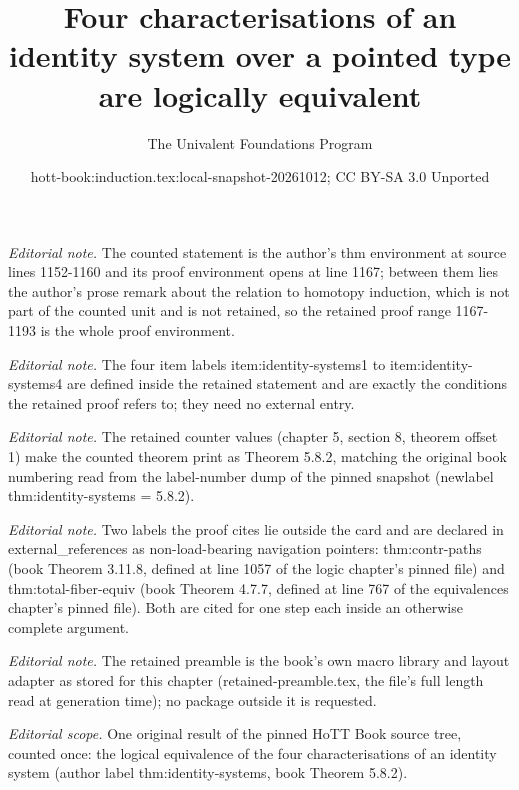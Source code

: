 \documentclass[10pt,a4paper]{article}
\title{Four characterisations of an identity system over a pointed type are logically equivalent}
\author{The Univalent Foundations Program}
\date{hott-book:induction.tex:local-snapshot-20261012; CC BY-SA 3.0 Unported}
\newcounter{chapter}
\theoremstyle{definition}
\theoremstyle{remark}
\numberwithin{equation}{section}
\begin{document}
\maketitle
\setcounter{chapter}{5}
\setcounter{section}{8}
\setcounter{thm}{1}
\noindent\textit{Editorial note.} The counted statement is the author's thm environment at source lines 1152-1160 and its proof environment opens at line 1167; between them lies the author's prose remark about the relation to homotopy induction, which is not part of the counted unit and is not retained, so the retained proof range 1167-1193 is the whole proof environment.\par\medskip
\noindent\textit{Editorial note.} The four item labels item:identity-systems1 to item:identity-systems4 are defined inside the retained statement and are exactly the conditions the retained proof refers to; they need no external entry.\par\medskip
\noindent\textit{Editorial note.} The retained counter values (chapter 5, section 8, theorem offset 1) make the counted theorem print as Theorem 5.8.2, matching the original book numbering read from the label-number dump of the pinned snapshot (newlabel thm:identity-systems = 5.8.2).\par\medskip
\noindent\textit{Editorial note.} Two labels the proof cites lie outside the card and are declared in external\_references as non-load-bearing navigation pointers: thm:contr-paths (book Theorem 3.11.8, defined at line 1057 of the logic chapter's pinned file) and thm:total-fiber-equiv (book Theorem 4.7.7, defined at line 767 of the equivalences chapter's pinned file). Both are cited for one step each inside an otherwise complete argument.\par\medskip
\noindent\textit{Editorial note.} The retained preamble is the book's own macro library and layout adapter as stored for this chapter (retained-preamble.tex, the file's full length read at generation time); no package outside it is requested.\par\medskip
\noindent\textit{Editorial scope.} One original result of the pinned HoTT Book source tree, counted once: the logical equivalence of the four characterisations of an identity system (author label thm:identity-systems, book Theorem 5.8.2).\par\medskip
\end{document}
